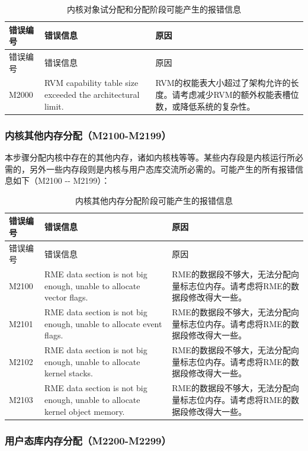 \begin{xltabular}{\textwidth}{@{}>{\hsize\raggedright\arraybackslash}X>{\hsize\raggedright\arraybackslash}X>{\hsize\raggedright\arraybackslash}X@{}}
\caption{内核对象试分配和分配阶段可能产生的报错信息}\label{tab:5-23}\\
\toprule
错误编号 & 错误信息 & 原因\tabularnewline
\endfirsthead
\toprule
错误编号 & 错误信息 & 原因\tabularnewline
\midrule
\endhead
\bottomrule
\endlastfoot
M2000 & RVM capability table size exceeded the architectural limit. &
RVM的权能表大小超过了架构允许的长度。请考虑减少RVM的额外权能表槽位数，或降低系统的复杂性。\tabularnewline
\end{xltabular}

\subsubsection{内核其他内存分配（M2100-M2199）}\label{subsubsec:5-6-6-2}

本步骤分配内核中存在的其他内存，诸如内核栈等等。某些内存段是内核运行所必需的，另外一些内存段则是内核与用户态库交流所必需的。可能产生的所有报错信息如下（M2100
-\/- M2199）：

\begin{xltabular}{\textwidth}{@{}>{\hsize\raggedright\arraybackslash}X>{\hsize\raggedright\arraybackslash}X>{\hsize\raggedright\arraybackslash}X@{}}
\caption{内核其他内存分配阶段可能产生的报错信息}\label{tab:5-24}\\
\toprule
错误编号 & 错误信息 & 原因\tabularnewline
\endfirsthead
\toprule
错误编号 & 错误信息 & 原因\tabularnewline
\midrule
\endhead
\bottomrule
\endlastfoot
M2100 & RME data section is not big enough, unable to allocate vector
flags. &
RME的数据段不够大，无法分配向量标志位内存。请考虑将RME的数据段修改得大一些。\tabularnewline
M2101 & RME data section is not big enough, unable to allocate event
flags. &
RME的数据段不够大，无法分配向量标志位内存。请考虑将RME的数据段修改得大一些。\tabularnewline
M2102 & RME data section is not big enough, unable to allocate kernel
stacks. &
RME的数据段不够大，无法分配向量标志位内存。请考虑将RME的数据段修改得大一些。\tabularnewline
M2103 & RME data section is not big enough, unable to allocate kernel
object memory. &
RME的数据段不够大，无法分配向量标志位内存。请考虑将RME的数据段修改得大一些。\tabularnewline
\end{xltabular}

\subsubsection{用户态库内存分配（M2200-M2299）}\label{subsubsec:5-6-6-3}

